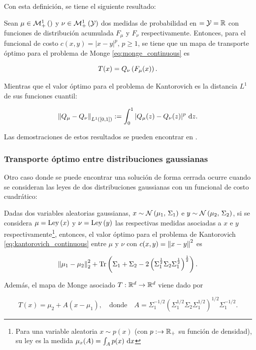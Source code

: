 Con esta definición, se tiene el siguiente resultado:

\begin{teo}
	Sean $\mu\in\mathcal{M}_+^1\left(\right)$ y $\nu\in\mathcal{M}_+^1\left(\mathcal{Y}\right)$ dos medidas de probabilidad en $=\mathcal{Y}=\mathbb{R}$ con funciones de distribución acumulada $F_\mu$ y $F_\nu$ respectivamente. Entonces, para el funcional de costo $c(x,y)=|x-y|^p,\,p\geq 1$, se tiene que un mapa de transporte óptimo para el problema de Monge \eqref{eq:monge_continuous} es

	\begin{equation*}
		T(x) = Q_\nu\left(F_\mu(x)\right).
	\end{equation*}

	Mientras que el valor óptimo para el problema de Kantorovich es la distancia $L^1$ de sus funciones cuantil:

	\begin{equation*}
		\left\lVert Q_\mu-Q_\nu \right\rVert_{L^1([0,1])}:=\int_0^1 |Q_\mu(z) - Q_\nu(z)|^p \,\operatorname{d}\! z .
	\end{equation*}
\end{teo}

Las demostraciones de estos resultados se pueden encontrar en \cite{Thorpe2018}.

\subsubsection{Transporte óptimo entre distribuciones gaussianas}

Otro caso donde se puede encontrar una solución de forma cerrada ocurre cuando se consideran las leyes de dos distribuciones gaussianas con un funcional de costo cuadrático:

\begin{teo}
	\label{teo:frechet_gaussian}
	Dadas dos variables aleatorias gaussianas, $x\sim\mathcal{N}\left(\mu_1,\,\Sigma_1\right)$ e $y\sim \mathcal{N}\left(\mu_2,\,\Sigma_2\right)$, si se considera $\mu=\operatorname{Ley}\left(x\right)$ y $\nu=\operatorname{Ley}\left(y\right)$ las respectivas medidas asociadas a $x$ e $y$ respectivamente\footnote{Para una variable aleatoria $x\sim p(x)$ (con $p:\to\mathbb{R}_+$ su función de densidad), su ley es la medida $\mu_x(A)=\int_A p(x)\,\operatorname{d}\! x$}, entonces, el valor óptimo para el problema de Kantorovich \eqref{eq:kantorovich_continuous} entre $\mu$ y $\nu$ con $c(x,y)=\left\lVert x-y \right\rVert^2$ es

	\begin{equation*}
		\left\lVert \mu_1-\mu_2 \right\rVert_2^2 + \operatorname{Tr}\left(\Sigma_1+\Sigma_2 - 2\left(\Sigma_1^\frac{1}{2}\Sigma_2\Sigma_1^\frac{1}{2}\right)^\frac{1}{2}\right) .
	\end{equation*}

	Además, el mapa de Monge asociado $T:\mathbb{R}^d\to\mathbb{R}^d$ viene dado por

	\begin{equation*}
		T(x) = \mu_2 + A(x - \mu_1),
		\quad\text{donde}\quad
		A = \Sigma_1^{-1/2}\left(\Sigma_1^{1/2} \Sigma_2 \Sigma_1^{1/2}\right)^{1/2}\Sigma_1^{-1/2} .
	\end{equation*}
\end{teo}

